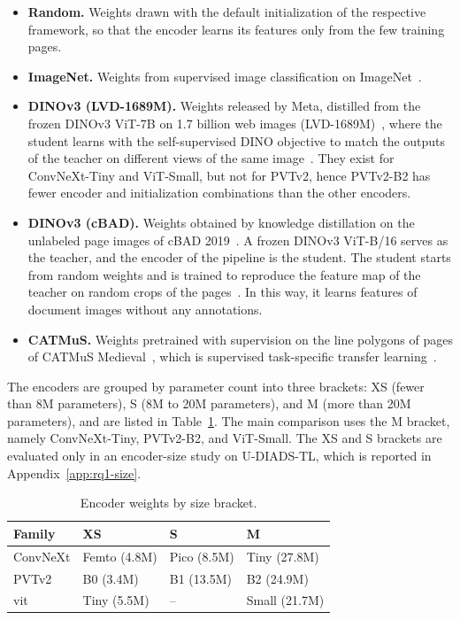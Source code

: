 \label{sec:initializations}
\begin{itemize}
    \item \textbf{Random.} Weights drawn with the default initialization of the respective framework, so that the encoder learns its features only from the few training pages.
    \item \textbf{ImageNet.} Weights from supervised image classification on ImageNet~\cite{deng2009imagenet}.
    \item \textbf{DINOv3 (LVD-1689M).} Weights released by Meta, distilled from the frozen DINOv3 ViT-7B on 1.7 billion web images (LVD-1689M)~\cite{dinov3}, where the student learns with the self-supervised DINO objective to match the outputs of the teacher on different views of the same image~\cite{caron2021dino}. They exist for ConvNeXt-Tiny and ViT-Small, but not for PVTv2, hence PVTv2-B2 has fewer encoder and initialization combinations than the other encoders.
    \item \textbf{DINOv3 (cBAD).} Weights obtained by knowledge distillation on the unlabeled page images of cBAD 2019~\cite{cbad-2019}. A frozen DINOv3 ViT-B/16 serves as the teacher, and the encoder of the pipeline is the student. The student starts from random weights and is trained to reproduce the feature map of the teacher on random crops of the pages~\cite{beyer2022knowledgedistillationgoodteacher}. In this way, it learns features of document images without any annotations.
    \item \textbf{CATMuS.} Weights pretrained with supervision on the line polygons of pages of CATMuS Medieval~\cite{catmus-medieval}, which is supervised task-specific transfer learning~\cite{tian2020rethinking}. 
\end{itemize}

\label{sec:encoder-size}

The encoders are grouped by parameter count into three brackets: XS (fewer than 8M parameters), S (8M to 20M parameters), and M (more than 20M parameters), and are listed in Table~\ref{tab:backbones}. The main comparison uses the M bracket, namely ConvNeXt-Tiny, PVTv2-B2, and ViT-Small. The XS and S brackets are evaluated only in an encoder-size study on U-DIADS-TL, which is reported in Appendix~\ref{app:rq1-size}.

\begin{table}[htbp]
    \centering
    \caption{Encoder weights by size bracket.}
    \label{tab:backbones}
    \small
    \begin{tabular}{@{}llll@{}}
        \toprule
        Family & XS & S & M \\
        \midrule
        ConvNeXt  & Femto (4.8M) & Pico (8.5M) & Tiny (27.8M) \\
        PVTv2     & B0 (3.4M) & B1 (13.5M) & B2 (24.9M) \\
        \gls{vit} & Tiny (5.5M) & -- & Small (21.7M) \\
        \bottomrule
    \end{tabular}
\end{table}

